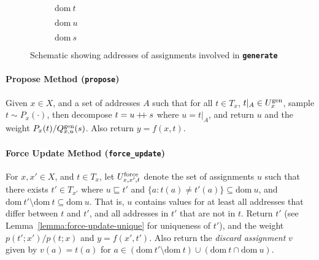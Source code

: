 \documentclass{article}
\newcommand{\code}[1]{\texttt{\small{\textbf{#1}}}}
\newcommand\doubleplus{\mathbin{+\mkern-5mu+}}
\newcommand{\concat}[0]{\doubleplus}
\newcommand{\dom}[1]{\mbox{dom}{~#1}}
\newcommand{\gen}[0]{\mbox{\scriptsize gen}}
\newcommand{\force}[0]{\mbox{\scriptsize force}}
\newcommand{\contained}[0]{\sqsubseteq}
\begin{document}
\begin{figure}[t]
\centering
\begin{subfigure}[b]{0.3\textwidth}
\centering
{}
\caption{$\dom{t}$}
\end{subfigure}%
\begin{subfigure}[b]{0.3\textwidth}
\centering
{}
\caption{$\dom{u}$}
\end{subfigure}
\begin{subfigure}[b]{0.3\textwidth}
\centering
{}
\caption{$\dom{s}$}
\end{subfigure}
\caption{Schematic showing addresses of assignments involved in \code{generate}}
\end{figure}

\paragraph{Propose Method (\code{propose})}
Given $x \in X$, and a set of addresses $A$ such that for all $t \in T_x$, $t|_A \in U^{\gen}_x$, sample $t \sim P_x(\cdot)$, then decompose $t = u \concat s$ where $u = t|_A$, and return $u$ and the weight $P_x(t) / Q^{\gen}_{x,u}(s)$.
Also return $y = f(x, t)$.



\paragraph{Force Update Method (\code{force\_update})}
For $x, x' \in X$, and $t \in T_x$, let $U^{\force}_{x,x',t}$ denote the set of assignments $u$ such that there exists $t' \in T_{x'}$ where $u \contained t'$ and $\{ a: t(a) \ne t'(a)\} \subseteq \dom{u}$, and $\dom{t'} \setminus \dom{t} \subseteq \dom{u}$.
That is, $u$ contains values for at least all addresses that differ between $t$ and $t'$, and all addresses in $t'$ that are not in $t$.
Return $t'$ (see Lemma~\ref{lemma:force-update-unique} for uniqueness of $t'$), and the weight $p(t'; x') / p(t; x)$ and $y = f(x', t')$.
Also return the \emph{discard assignment} $v$ given by $v(a) = t(a)$ for $a \in (\dom{t'} \setminus \dom{t}) \cup (\dom{t} \cap \dom{u})$.
\end{document}
